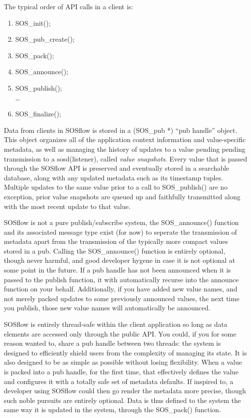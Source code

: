 The typical order of API calls in a client is:
\begin{enumerate}
    \item SOS\_init();
    \item SOS\_pub\_create();
    \item SOS\_pack();
    \item SOS\_announce();
    \item SOS\_publish();\\
    \dots
    \item SOS\_finalize();
\end{enumerate}

Data from clients in SOSflow is stored in a (SOS\_pub *) ``pub handle''
object. This object organizes all of the application context
information and value-specific metadata, as well as managing the
history of updates to a value pending pending transmission to a
sosd(listener), called \textit{value snapshots}. Every value that is
passed through the SOSflow API is preserved and eventually stored in a
searchable database, along with any updated metadata such as its
timestamp tuples.  Multiple updates to the same value prior to a call
to SOS\_publish() are no exception, prior value snapshots are queued
up and faithfully transmitted along with the most recent update to
that value.

SOSflow is not a pure publish/subscribe system, the SOS\_announce()
function and its associated message type exist (for now) to seperate the
transmission of metadata apart from the transmission of the typically
more compact values stored in a pub.  Calling the SOS\_announce()
function is entirely optional, though never harmful, and good
developer hygene in case it is not optional at some point in the
future. If a pub handle has not been announced when it is passed to
the publish function, it with automatically recurse into the announce
function on your behalf.  Additionally, if you have added new value
names, and not merely packed updates to some previously announced
values, the next time you publish, those new value names will
automatically be announced.

SOSflow is entirely thread-safe within the client application so long
as data elements are accessed only through the public API. You could,
if you for some reason wanted to, share a pub handle between two
threads: the system is designed to efficiently shield users from the
complexity of managing its state.  It is also designed to be as simple
as possible without losing flexibility. When a value is packed into a
pub handle, for the first time, that effectively defines the value and
configures it with a totally safe set of metadata defaults. If inspired
to, a developer using SOSflow could then go render the metadata more
precise, though such noble pursuits are entirely optional. Data is
thus defined to the system the same way it is updated in the system,
through the SOS\_pack() function.

